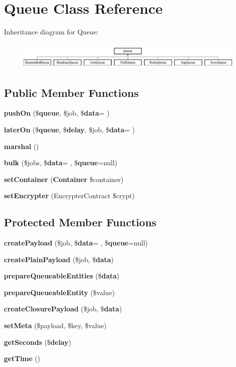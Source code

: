\section{Queue Class Reference}
\label{class_illuminate_1_1_queue_1_1_queue}
Inheritance diagram for Queue\+:\begin{figure}[H]
\begin{center}
\leavevmode
\includegraphics[height=1.344538cm]{class_illuminate_1_1_queue_1_1_queue}
\end{center}
\end{figure}
\subsection*{Public Member Functions}
\begin{DoxyCompactItemize}
\item 
{\bf push\+On} (\${\bf queue}, \$job, \${\bf data}= \textquotesingle{}\textquotesingle{})
\item 
{\bf later\+On} (\${\bf queue}, \${\bf delay}, \$job, \${\bf data}= \textquotesingle{}\textquotesingle{})
\item 
{\bf marshal} ()
\item 
{\bf bulk} (\$jobs, \${\bf data}= \textquotesingle{}\textquotesingle{}, \${\bf queue}=null)
\item 
{\bf set\+Container} ({\bf Container} \$container)
\item 
{\bf set\+Encrypter} (Encrypter\+Contract \$crypt)
\end{DoxyCompactItemize}
\subsection*{Protected Member Functions}
\begin{DoxyCompactItemize}
\item 
{\bf create\+Payload} (\$job, \${\bf data}= \textquotesingle{}\textquotesingle{}, \${\bf queue}=null)
\item 
{\bf create\+Plain\+Payload} (\$job, \${\bf data})
\item 
{\bf prepare\+Queueable\+Entities} (\${\bf data})
\item 
{\bf prepare\+Queueable\+Entity} (\$value)
\item 
{\bf create\+Closure\+Payload} (\$job, \${\bf data})
\item 
{\bf set\+Meta} (\$payload, \$key, \$value)
\item 
{\bf get\+Seconds} (\${\bf delay})
\item 
{\bf get\+Time} ()
\end{DoxyCompactItemize}
